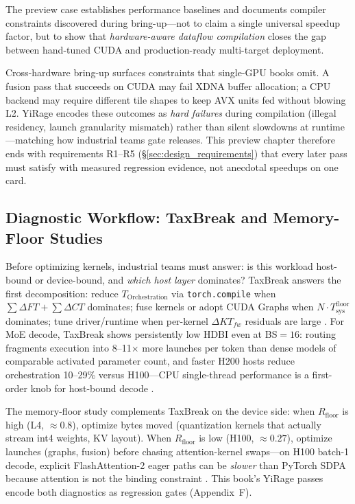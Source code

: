 The preview case establishes performance baselines and documents compiler constraints discovered during bring-up---not to claim a single universal speedup factor, but to show that \emph{hardware-aware dataflow compilation} closes the gap between hand-tuned CUDA and production-ready multi-target deployment.

Cross-hardware bring-up surfaces constraints that single-GPU books omit.
A fusion pass that succeeds on CUDA may fail XDNA buffer allocation; a CPU backend may require different tile shapes to keep AVX units fed without blowing L2.
YiRage encodes these outcomes as \emph{hard failures} during compilation (illegal residency, launch granularity mismatch) rather than silent slowdowns at runtime---matching how industrial teams gate releases.
This preview chapter therefore ends with requirements R1--R5 (\S\ref{sec:design_requirements}) that every later pass must satisfy with measured regression evidence, not anecdotal speedups on one card.

\subsection{Diagnostic Workflow: TaxBreak and Memory-Floor Studies}
\label{sec:diagnostic_workflow}

Before optimizing kernels, industrial teams must answer: is this workload host-bound or device-bound, and \emph{which host layer} dominates?
TaxBreak answers the first decomposition: reduce $T_{\mathrm{Orchestration}}$ via \texttt{torch.compile} when $\sum \Delta FT + \sum \Delta CT$ dominates; fuse kernels or adopt CUDA Graphs when $N \cdot T_{\mathrm{sys}}^{\mathrm{floor}}$ dominates; tune driver/runtime when per-kernel $\Delta KT_{fw}$ residuals are large \citep{taxbreak2026}.
For MoE decode, TaxBreak shows persistently low HDBI even at BS${=}16$: routing fragments execution into 8--11$\times$ more launches per token than dense models of comparable activated parameter count, and faster H200 hosts reduce orchestration 10--29\% versus H100---CPU single-thread performance is a first-order knob for host-bound decode \citep{taxbreak2026}.

The memory-floor study complements TaxBreak on the device side: when $R_{\mathrm{floor}}$ is high (L4, ${\approx}0.8$), optimize bytes moved (quantization kernels that actually stream int4 weights, KV layout).
When $R_{\mathrm{floor}}$ is low (H100, ${\approx}0.27$), optimize launches (graphs, fusion) before chasing attention-kernel swaps---on H100 batch-1 decode, explicit FlashAttention-2 eager paths can be \emph{slower} than PyTorch SDPA because attention is not the binding constraint \citep{memoryfloor2026,taxbreak2026}.
This book's YiRage passes encode both diagnostics as regression gates (Appendix~F).

